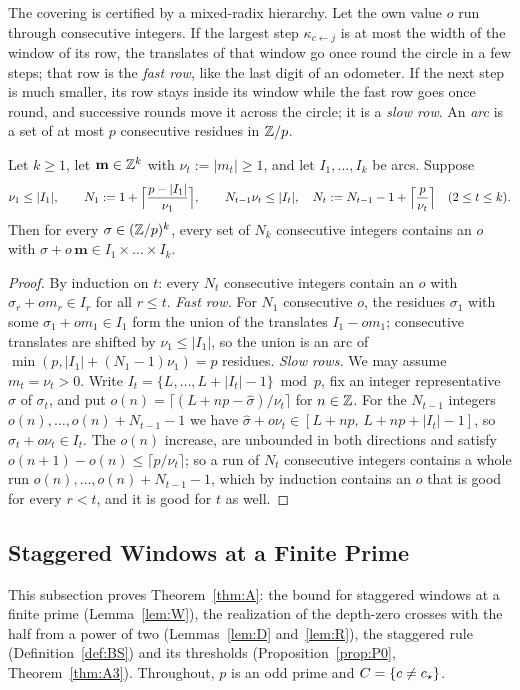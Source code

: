 The covering is certified by a mixed-radix hierarchy. Let the own value $o$ run through consecutive integers. If the largest step $\kappa_{c\leftarrow j}$ is at most the width of the window of its row, the translates of that window go once round the circle in a few steps; that row is the \emph{fast row}, like the last digit of an odometer. If the next step is much smaller, its row stays inside its window while the fast row goes once round, and successive rounds move it across the circle; it is a \emph{slow row}. An \emph{arc} is a set of at most $p$ consecutive residues in $\mathbb{Z}/p$.

\begin{lemma}\label{lem:ws}
Let $k\ge1$, let $\mathbf m\in\mathbb{Z}^k$ with $\nu_t:=|m_t|\ge1$, and let $I_1,\dots,I_k$ be arcs. Suppose
\[
\nu_1\le|I_1|,\qquad N_1:=1+\Bigl\lceil\frac{p-|I_1|}{\nu_1}\Bigr\rceil,\qquad N_{t-1}\nu_t\le|I_t|,\quad N_t:=N_{t-1}-1+\Bigl\lceil\frac p{\nu_t}\Bigr\rceil\quad(2\le t\le k).
\]
Then for every $\sigma\in(\mathbb{Z}/p)^k$, every set of $N_k$ consecutive integers contains an $o$ with $\sigma+o\,\mathbf m\in I_1\times\dots\times I_k$.
\end{lemma}

\begin{proof}
By induction on $t$: every $N_t$ consecutive integers contain an $o$ with $\sigma_r+om_r\in I_r$ for all $r\le t$. \emph{Fast row.} For $N_1$ consecutive $o$, the residues $\sigma_1$ with some $\sigma_1+om_1\in I_1$ form the union of the translates $I_1-om_1$; consecutive translates are shifted by $\nu_1\le|I_1|$, so the union is an arc of $\min(p,|I_1|+(N_1-1)\nu_1)=p$ residues. \emph{Slow rows.} We may assume $m_t=\nu_t>0$. Write $I_t=\{L,\dots,L+|I_t|-1\}\bmod p$, fix an integer representative $\hat\sigma$ of $\sigma_t$, and put $o(n)=\lceil(L+np-\hat\sigma)/\nu_t\rceil$ for $n\in\mathbb{Z}$. For the $N_{t-1}$ integers $o(n),\dots,o(n)+N_{t-1}-1$ we have $\hat\sigma+o\nu_t\in[L+np,\,L+np+|I_t|-1]$, so $\sigma_t+o\nu_t\in I_t$. The $o(n)$ increase, are unbounded in both directions and satisfy $o(n+1)-o(n)\le\lceil p/\nu_t\rceil$; so a run of $N_t$ consecutive integers contains a whole run $o(n),\dots,o(n)+N_{t-1}-1$, which by induction contains an $o$ that is good for every $r<t$, and it is good for $t$ as well.
\end{proof}

\subsection{Staggered Windows at a Finite Prime}\label{app:BSfinite}
This subsection proves Theorem~\ref{thm:A}: the bound for staggered windows at a finite prime (Lemma~\ref{lem:W}), the realization of the depth-zero crosses with the half from a power of two (Lemmas~\ref{lem:D} and~\ref{lem:R}), the staggered rule (Definition~\ref{def:BS}) and its thresholds (Proposition~\ref{prop:P0}, Theorem~\ref{thm:A3}). Throughout, $p$ is an odd prime and $C=\{c\ne c_{\star}\}$.

